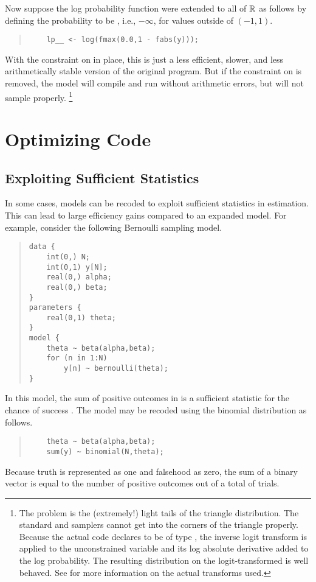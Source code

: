 Now suppose the log probability function were extended to all of
$\mathbb{R}$ as follows by defining the probability to be ,
i.e., $-\infty$, for values outside of $(-1,1)$.
%
\begin{quote}
\begin{Verbatim}
    lp__ <- log(fmax(0.0,1 - fabs(y)));
\end{Verbatim}
\end{quote}
%
With the constraint on  in place, this is just a less
efficient, slower, and less arithmetically stable version of the
original program.  But if the constraint on  is removed, 
the model will compile and run without arithmetic errors, but will not
sample properly.%
%
\footnote{The problem is the (extremely!) light tails of the triangle
  distribution.  The standard \HMC and \NUTS samplers cannot get into the
  corners of the triangle properly.  Because the actual code declares
   to be of type , the inverse logit
  transform is applied to the unconstrained variable and its log
  absolute derivative added to the log probability.  The resulting
  distribution on the logit-transformed  is well behaved.  See
   for more information on the actual
  transforms used.}



\chapter{Optimizing \Stan Code}\label{optimization.chapter}
\noindent

\section{Exploiting Sufficient Statistics}

In some cases, models can be recoded to exploit sufficient statistics
in estimation.  This can lead to large efficiency gains compared to an
expanded model.  For example, consider the following Bernoulli
sampling model.
%
\begin{quote}
\begin{Verbatim}
data {
    int(0,) N;
    int(0,1) y[N];
    real(0,) alpha;
    real(0,) beta;
}
parameters {
    real(0,1) theta;
}
model {
    theta ~ beta(alpha,beta);
    for (n in 1:N) 
        y[n] ~ bernoulli(theta);
}
\end{Verbatim}
\end{quote}
%
In this model, the sum of positive outcomes in  is a
sufficient statistic for the chance of success .  The
model may be recoded using the binomial distribution as follows.
%
\begin{quote}
\begin{Verbatim}
    theta ~ beta(alpha,beta);
    sum(y) ~ binomial(N,theta);
\end{Verbatim}
\end{quote}
%
Because truth is represented as one and falsehood as zero, the sum
 of a binary vector  is equal to the number of
positive outcomes out of a total of  trials.  



